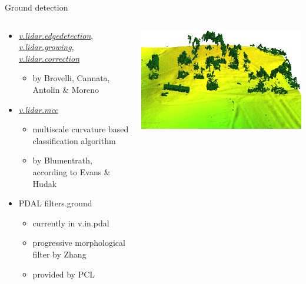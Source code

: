 \documentclass[xcolor={dvipsnames,usenames},beamer,aspectratio=43]{beamer}
\newcommand{\gmodule}[1]{\href{http://grass.osgeo.org/grass71/manuals/#1.html}{\emph{#1}}}
\newcommand{\amodule}[1]{\href{http://grass.osgeo.org/grass70/manuals/addons/#1.html}{\emph{#1}}}
\begin{document}
\begin{frame}{Ground detection}

\begin{columns}
\begin{column}{0.35\textwidth}

\begin{itemize}
\item \gmodule{v.lidar.edgedetection}, \gmodule{v.lidar.growing}, \gmodule{v.lidar.correction}
\begin{itemize}
  \item \tiny by Brovelli, Cannata, Antolin \& Moreno
\end{itemize}

\item \amodule{v.lidar.mcc}
\begin{itemize}
  \item \tiny multiscale curvature based classification algorithm
  \item \tiny by Blumentrath, according to Evans \& Hudak
\end{itemize}

\item PDAL filters.ground
\begin{itemize}
  \item \tiny currently in v.in.pdal
  \item \tiny progressive morphological filter by Zhang
  \item \tiny provided by PCL
\end{itemize}

\end{itemize}

\end{column}
\begin{column}{0.64\textwidth}

\begin{center}
  \includegraphics[width=\textwidth]{grass/mcc_default_smaller}
\end{center}

\end{column}
\end{columns}

\end{frame}
\end{document}
